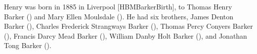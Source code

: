 
Henry was born in 1885 in Liverpool [HBMBarkerBirth],  to Thomas Henry Barker () and Mary Ellen Moulsdale (). He had six brothers,  James Denton Barker (), Charles Frederick Strangways Barker (), Thomas Percy Conyers Barker (), Francis Darcy Mead Barker (), William Danby Holt Barker (), and Jonathan Tong Barker ().

